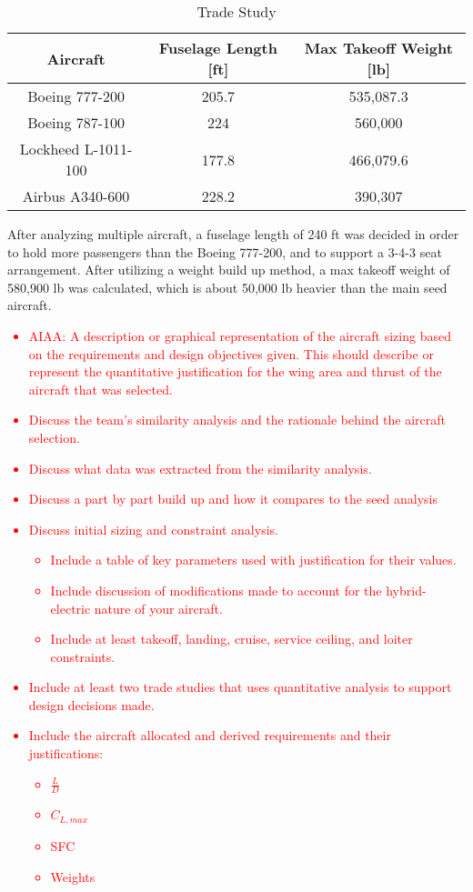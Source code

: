 \begin{table}[h!] 
    \centering
    \caption{Trade Study}
    \begin{tabular}{ |c||c||c| }\toprule
    \textbf{Aircraft} & \textbf{Fuselage Length [ft]} & \textbf{Max Takeoff Weight [lb]} \\\hline\hline
    Boeing 777-200 & 205.7 & 535,087.3  \\\hline
    Boeing 787-100 & 224 & 560,000  \\\hline
    Lockheed L-1011-100 & 177.8 & 466,079.6  \\\hline
    Airbus A340-600 & 228.2 & 390,307  \\\hline

    \end{tabular}\label{tab:req}
\end{table}

After analyzing multiple aircraft, a fuselage length of 240 ft was decided in order to hold more passengers than the Boeing 777-200, and to support a 3-4-3 seat arrangement. After utilizing a weight build up method, a max takeoff weight of 580,900 lb was calculated, which is about 50,000 lb heavier than the main seed aircraft. 

\textcolor{red}{\begin{itemize}
    \item AIAA: A description or graphical representation of the aircraft sizing based on the
requirements and design objectives given. This should describe or represent the
quantitative justification for the wing area and thrust of the aircraft that was selected.
    \item Discuss the team’s similarity analysis and the rationale behind the aircraft selection.
    \item Discuss what data was extracted from the similarity analysis.
    \item Discuss a part by part build up and how it compares to the seed analysis
    \item Discuss initial sizing and constraint analysis.
    \begin{itemize}
        \item Include a table of key parameters used with justification for their values.
        \item Include discussion of modifications made to account for the hybrid-electric nature of your aircraft.
        \item Include at least takeoff, landing, cruise, service ceiling, and loiter constraints.
    \end{itemize}
    \item Include at least two trade studies that uses quantitative analysis to support design decisions made.
    \item Include the aircraft allocated and derived requirements and their justifications:
    \begin{itemize}
        \item $\frac{L}{D}$
        \item $C_{L,max}$
        \item SFC
        \item Weights
    \end{itemize}
\end{itemize}}